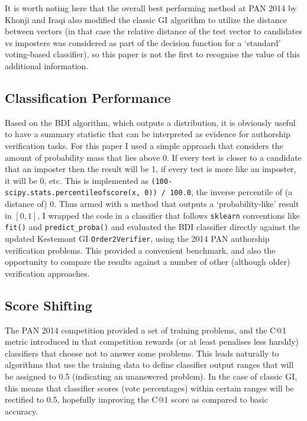 \documentclass[
    hf
]{ceurart}
\begin{document}
It is worth noting here that the overall best performing method at PAN 2014 by Khonji and Iraqi
\cite{khonji_iraqi} also modified the classic GI algorithm to utilize the distance between vectors
(in that case the relative distance of the test vector to candidates vs imposters was considered as
part of the decision function for a `standard' voting-based classifier), so this paper is not the
first to recognise the value of this additional information.

\subsection{Classification Performance}

Based on the BDI algorithm, which outputs a distribution, it is obviously useful to have a summary
statistic that can be interpreted as evidence for authorship verification tasks. For this paper I
used a simple approach that considers the amount of probability mass that lies above 0. If every
test is closer to a candidate that an imposter then the result will be 1, if every test is more like
an imposter, it will be 0, etc. This is implemented as \texttt{(100-scipy.stats.percentileofscore(x,
    0)) / 100.0}, the inverse percentile of (a distance of) 0. Thus armed with a method that outputs a
`probability-like' result in $[0,1]$, I wrapped the code in a classifier that follows
\texttt{sklearn} \cite{scikit-learn} conventions like \texttt{fit()} and \texttt{predict\_proba()}
and evaluated the BDI classifier directly against the updated Kestemont GI \texttt{Order2Verifier},
using the 2014 PAN authorship verification problems. This provided a convenient benchmark, and also
the opportunity to compare the results against a number of other (although older) verification
approaches.

\subsection{Score Shifting}

The PAN 2014 competition provided a set of training problems, and the C@1 metric introduced in that
competition rewards (or at least penalises less harshly) classifiers that choose not to answer some
problems. This leads naturally to algorithms that use the training data to define classifier output
ranges that will be assigned to 0.5 (indicating an unanswered problem). In the case of classic GI,
this means that classifier scores (vote percentages) within certain ranges will be rectified to 0.5,
hopefully improving the C@1 score as compared to basic accuracy.
\end{document}
